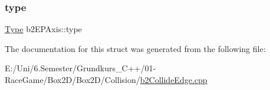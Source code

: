 \mbox{\label{structb2_e_p_axis_a336d3ba4b4ed020a1f6c4c0f70098e39}} 
\subsubsection{\texorpdfstring{type}{type}}
{\footnotesize\ttfamily \mbox{\hyperlink{structb2_e_p_axis_a1a2feab0d321a5cd20677c92cbfd6f3c}{Type}} b2\+E\+P\+Axis\+::type}



The documentation for this struct was generated from the following file\+:\begin{DoxyCompactItemize}
\item 
E\+:/\+Uni/6.\+Semester/\+Grundkurs\+\_\+\+C++/01-\/\+Race\+Game/\+Box2\+D/\+Box2\+D/\+Collision/\mbox{\hyperlink{b2_collide_edge_8cpp}{b2\+Collide\+Edge.\+cpp}}\end{DoxyCompactItemize}
